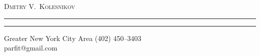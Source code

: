 \pagestyle{fancy}
\renewcommand{\headrulewidth}{0pt}
\setlength{\parindent}{0in}

\begin{center}
\begin{LARGE}
\textsc{Dmitry V.\ Kolesnikov}
\end{LARGE}
\end{center}
\vspace{-0.5mm}
\hrule
\vspace{0.3mm}
\hrule
\vspace{3mm}
\begin{small}\textnormal{Greater New York City Area} \hfill \textnormal{\Telefon\hspace{1mm}(402) 450--3403}\\ %
\null \hfill \textnormal{\Letter\hspace{0.8mm}parfit@gmail.com}\\\end{small}
\vspace{2mm}